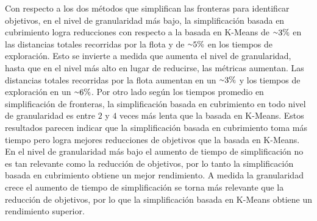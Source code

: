 Con respecto a los dos métodos que simplifican las fronteras para 
identificar objetivos, en el nivel de granularidad más bajo, la
simplificación basada en cubrimiento logra reducciones con respecto a la
basada en K-Means de ${\smallsim}3\%$ en las distancias totales recorridas por la
flota y de ${\smallsim}5\%$ en los tiempos de exploración. Esto se invierte a
medida que aumenta el nivel de granularidad, hasta que en el nivel más alto en
lugar de reducirse, las métricas aumentan. Las distancias totales recorridas por la
flota aumentan en un ${\smallsim}3\%$ y los tiempos de exploración en un
${\smallsim}6\%$. Por otro lado según los tiempos
promedio en simplificación de fronteras, la simplificación basada en
cubrimiento en todo nivel de granularidad es entre $2$ y
$4$ veces más lenta que la basada en K-Means. Estos resultados
parecen indicar que la simplificación basada en cubrimiento toma más tiempo
pero logra mejores reducciones de objetivos que la basada en K-Means. En el
nivel de granularidad más bajo el aumento de tiempo de simplificación no es tan
relevante como la reducción de objetivos, por lo tanto la simplificación basada
en cubrimiento obtiene un mejor rendimiento. A medida la granularidad crece el
aumento de tiempo de simplificación se torna más relevante que la reducción de
objetivos, por lo que la simplificación basada en K-Means obtiene un
rendimiento superior.  




